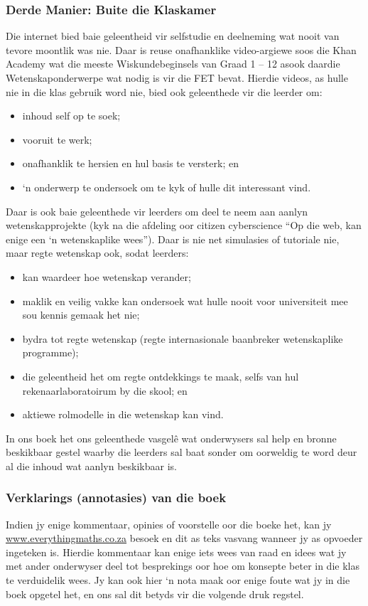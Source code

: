 \subsubsection{Derde Manier: Buite die Klaskamer}
Die internet bied baie geleentheid vir selfstudie en deelneming wat nooit van tevore moontlik was nie. Daar is reuse onafhanklike video-argiewe soos die Khan Academy wat die meeste Wiskundebeginsels van Graad 1 – 12 asook daardie Wetenskaponderwerpe wat nodig is vir die FET bevat. Hierdie videos, as hulle nie in die klas gebruik word nie, bied ook geleenthede vir die leerder om:
\begin{itemize}[noitemsep]
\item inhoud self op te soek;
\item vooruit te werk;
\item onafhanklik te hersien en hul basis te versterk; en 
\item ‘n onderwerp te ondersoek om te kyk of hulle dit interessant vind.
\end{itemize}
Daar is ook baie geleenthede vir leerders om deel te neem aan aanlyn wetenskapprojekte (kyk na die afdeling oor citizen cyberscience “Op die web, kan enige een ‘n wetenskaplike wees”). Daar is nie net simulasies of tutoriale nie, maar regte wetenskap ook, sodat leerders:
\begin{itemize}[noitemsep]
\item kan waardeer hoe wetenskap verander;
\item maklik en veilig vakke kan ondersoek wat hulle nooit voor universiteit mee sou kennis gemaak het nie;
\item bydra tot regte wetenskap (regte internasionale baanbreker wetenskaplike programme);
\item die geleentheid het om regte ontdekkings te maak, selfs van hul rekenaarlaboratoirum by die skool; en
\item aktiewe rolmodelle in die wetenskap kan vind.
\end{itemize}
In ons boek het ons geleenthede vasgelê wat onderwysers sal help en bronne beskikbaar gestel waarby die leerders sal baat sonder om oorweldig te word deur al die inhoud wat aanlyn beskikbaar is.

\subsubsection{Verklarings (annotasies) van die boek}
Indien jy enige kommentaar, opinies of voorstelle oor die boeke het, kan jy \underline{www.everythingmaths.co.za} besoek en dit as teks vasvang wanneer jy as opvoeder ingeteken is. Hierdie kommentaar kan enige iets wees van raad en idees wat jy met ander onderwyser deel tot besprekings oor hoe om konsepte beter in die klas te verduidelik wees. Jy kan ook hier ‘n nota maak oor enige foute wat jy in die boek opgetel het, en ons sal dit betyds vir die volgende druk regstel.\par

